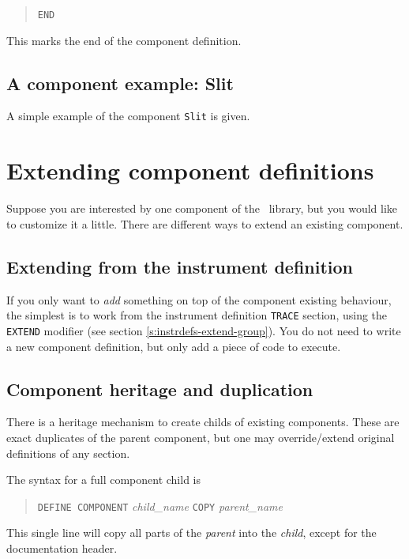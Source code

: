 \begin{quote}
  \texttt{END}
\end{quote}
This marks the end of the component definition.

\subsection{A component example: Slit}
\label{s:slit}
A simple example of the component \texttt{Slit} is given.



\section{Extending component definitions}
\label{s:compdefs-extend}

Suppose you are interested by one component of the \MCX\ library, but you would like to customize it a little. There are different ways to extend an existing component.

\subsection{Extending from the instrument definition}

If you only want to \emph{add} something on top of the component existing behaviour, the simplest is to work from the instrument definition \texttt{TRACE} section, using the \texttt{EXTEND} modifier (see section \ref{s:instrdefs-extend-group}). You do not need to write a new component definition, but only add a piece of code to execute.

\subsection{Component heritage and duplication}

There is a heritage mechanism to create childs of existing components. These are exact duplicates of the parent component, but one may override/extend original definitions of any section.

The syntax for a full component child is
\begin{quote}
  \texttt{DEFINE COMPONENT} \textit{child\_name} \texttt{COPY} \textit{parent\_name}
\end{quote}
This single line will copy all parts of the \textit{parent} into the \textit{child}, except for the documentation header.


